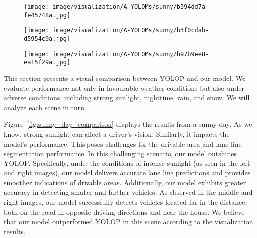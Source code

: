 \documentclass[lettersize,journal]{IEEEtran}
\begin{document}
\begin{figure*}[!h]
    \medskip

\begin{subfigure}[b]{0.05\textwidth}
        \centering
        \vspace{0.1cm}
    \end{subfigure}\begin{subfigure}{0.25\textwidth}
        \centering
        \texttt{[image: image/visualization/A-YOLOMs/sunny/b394dd7a-fe45748a.jpg]}
    \end{subfigure}\hspace{0.5cm}
    \begin{subfigure}{0.25\textwidth}
        \centering
        \texttt{[image: image/visualization/A-YOLOMs/sunny/b3f0cdab-d5954c9a.jpg]}
    \end{subfigure}\hspace{0.5cm}
    \begin{subfigure}{0.25\textwidth}
        \centering
        \texttt{[image: image/visualization/A-YOLOMs/sunny/b97b9ee8-ea15f29a.jpg]}
    \end{subfigure}

    \caption{Visual Comparison of Results on a Sunny Day}
    \label{fig:sunny_day_comparison}
\end{figure*}
This section presents a visual comparison between YOLOP and our model. We evaluate performance not only in favourable weather conditions but also under adverse conditions, including strong sunlight, nighttime, rain, and snow. We will analyze each scene in turn. 

Figure~\ref{fig:sunny_day_comparison} displays the results from a sunny day. As we know, strong sunlight can affect a driver's vision. Similarly, it impacts the model's performance. This poses challenges for the drivable area and lane line segmentation performance. In this challenging scenario, our model outshines YOLOP. Specifically, under the conditions of intense sunlight (as seen in the left and right images), our model delivers accurate lane line predictions and provides smoother indications of drivable areas. Additionally, our model exhibits greater accuracy in detecting smaller and farther vehicles. As observed in the middle and right images, our model successfully detects vehicles located far in the distance, both on the road in opposite driving directions and near the house. We believe that our model outperformed YOLOP in this scene according to the visualization results.
\end{document}
